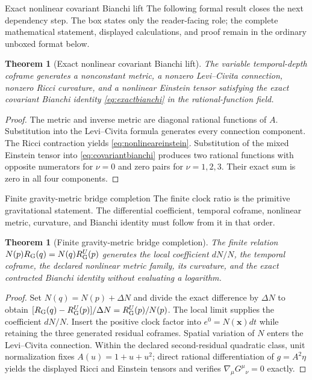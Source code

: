 \documentclass[11pt]{article}
\numberwithin{equation}{section}
\newtheorem{theorem}[definition]{Theorem}
\theoremstyle{remark}
\begin{document}
\begin{proofguide}{Exact nonlinear covariant Bianchi lift}
The following formal result closes the next dependency step. The box states only the reader-facing role; the complete mathematical statement, displayed calculations, and proof remain in the ordinary unboxed format below.
\end{proofguide}
\begin{theorem}[Exact nonlinear covariant Bianchi lift]
The variable temporal-depth coframe generates a nonconstant metric, a nonzero Levi--Civita connection, nonzero Ricci curvature, and a nonlinear Einstein tensor satisfying the exact covariant Bianchi identity \eqref{eq:exactbianchi} in the rational-function field.
\end{theorem}
\begin{proof}
The metric and inverse metric are diagonal rational functions of $A$. Substitution into the Levi--Civita formula generates every connection component. The Ricci contraction yields \eqref{eq:nonlineareinstein}. Substitution of the mixed Einstein tensor into \eqref{eq:covariantbianchi} produces two rational functions with opposite numerators for $\nu=0$ and zero pairs for $\nu=1,2,3$. Their exact sum is zero in all four components.
\end{proof}


\begin{proofguide}{Finite gravity-metric bridge completion}
The finite clock ratio is the primitive gravitational statement. The differential coefficient, temporal coframe, nonlinear metric, curvature, and Bianchi identity must follow from it in that order.
\end{proofguide}
\begin{theorem}[Finite gravity-metric bridge completion]
The finite relation $N(p)R_{\rm G}(q)=N(q)R_{\rm G}^{U}(p)$ generates the local coefficient $dN/N$, the temporal coframe, the declared nonlinear metric family, its curvature, and the exact contracted Bianchi identity without evaluating a logarithm.
\end{theorem}
\begin{proof}
Set $N(q)=N(p)+\Delta N$ and divide the exact difference by $\Delta N$ to obtain $[R_{\rm G}(q)-R_{\rm G}^{U}(p)]/\Delta N=R_{\rm G}^{U}(p)/N(p)$. The local limit supplies the coefficient $dN/N$. Insert the positive clock factor into $e^0=N(\mathbf x)dt$ while retaining the three generated residual coframes. Spatial variation of $N$ enters the Levi--Civita connection. Within the declared second-residual quadratic class, unit normalization fixes $A(u)=1+u+u^2$; direct rational differentiation of $g=A^2\eta$ yields the displayed Ricci and Einstein tensors and verifies $\nabla_\mu G^\mu{}_{\nu}=0$ exactly.
\end{proof}
\end{document}
